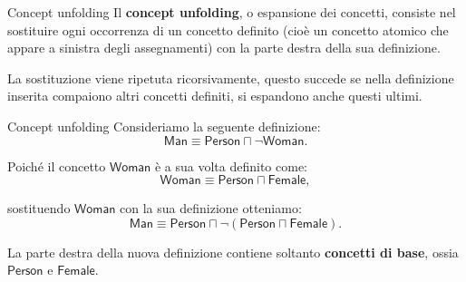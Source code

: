 \begin{definition}{Concept unfolding}
    Il \textbf{concept unfolding}, o espansione dei concetti,
    consiste nel sostituire ogni occorrenza di un concetto
    definito (cioè un concetto atomico che appare a sinistra degli assegnamenti) 
    con la parte destra della sua definizione.

    La sostituzione viene ripetuta ricorsivamente, questo succede se nella
    definizione inserita compaiono altri concetti definiti,
    si espandono anche questi ultimi.
\end{definition}

\begin{example}{Concept unfolding}
    Consideriamo la seguente definizione:
    \[
        \mathsf{Man} \equiv
        \mathsf{Person} \sqcap \neg\mathsf{Woman}.
    \]

    Poiché il concetto $\mathsf{Woman}$ è a sua volta
    definito come:
    \[
        \mathsf{Woman} \equiv
        \mathsf{Person} \sqcap \mathsf{Female},
    \]

    sostituendo $\mathsf{Woman}$ con la sua definizione
    otteniamo:
    \[
        \mathsf{Man} \equiv
        \mathsf{Person} \sqcap
        \neg(\mathsf{Person} \sqcap \mathsf{Female}).
    \]

    La parte destra della nuova definizione contiene
    soltanto \textbf{concetti di base}, ossia
    $\mathsf{Person}$ e $\mathsf{Female}$.
\end{example}

